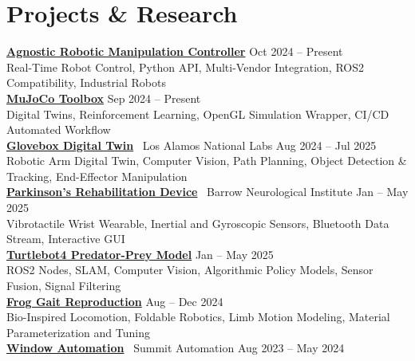 \documentclass[10pt]{article}
\begin{document}
\section*{Projects \& Research}
\textbf{\href{https://github.com/MGross21/armctl}{Agnostic Robotic Manipulation Controller}} \hfill Oct 2024 -- Present \\
\hspace*{2em}Real-Time Robot Control, Python API, Multi-Vendor Integration, ROS2 Compatibility, Industrial Robots
\\
\textbf{\href{https://github.com/MGross21/mujoco-toolbox}{MuJoCo Toolbox}} \hfill Sep 2024 -- Present \\
\hspace*{2em}Digital Twins, Reinforcement Learning, OpenGL Simulation Wrapper, CI/CD Automated Workflow
\\
\textbf{\href{https://github.com/MGross21/glovebox-digitaltwin}{Glovebox Digital Twin}} \textbar\ Los Alamos National Labs  \hfill Aug 2024 -- Jul 2025 \\
\hspace*{2em}Robotic Arm Digital Twin, Computer Vision, Path Planning, Object Detection \& Tracking, End-Effector Manipulation
\\
\textbf{\href{https://github.com/MGross21/syncstride-wearable}{Parkinson's Rehabilitation Device}} \textbar\ Barrow Neurological Institute \hfill Jan -- May 2025 \\
\hspace*{2em}Vibrotactile Wrist Wearable, Inertial and Gyroscopic Sensors, Bluetooth Data Stream, Interactive GUI
\\
\textbf{\href{https://ASU-RAS598-2025-S-TEAM02.github.io}{Turtlebot4 Predator-Prey Model}} \hfill Jan -- May 2025 \\
\hspace*{2em}ROS2 Nodes, SLAM, Computer Vision, Algorithmic Policy Models, Sensor Fusion, Signal Filtering
\\
\textbf{\href{https://github.com/MGross21/Robotic-Jumping-Frog}{Frog Gait Reproduction}} \hfill Aug -- Dec 2024 \\
\hspace*{2em}Bio-Inspired Locomotion, Foldable Robotics, Limb Motion Modeling, Material Parameterization and Tuning
\\
\textbf{\href{https://www.linkedin.com/posts/mhgross_asu-innovationshowcase-capstoneproject-activity-7192395158401765376-nWLz}{Window Automation}} \textbar\ Summit Automation \hfill Aug 2023 -- May 2024 \\
\end{document}
